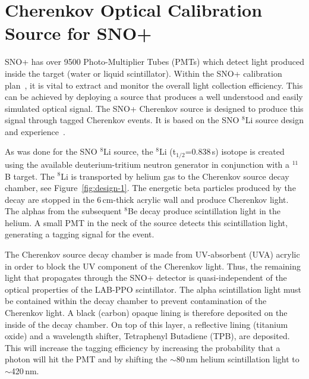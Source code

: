 \newcommand{\Li}{$^{8}$Li }
\renewcommand{\bf}{\bfseries}

\chapter{Cherenkov Optical Calibration Source for SNO+}
\label{ch:chsrc}

\label{chap:execsummary}

SNO+ has over 9500 Photo-Multiplier Tubes (PMTs) which detect light produced inside the target (water or liquid scintillator). Within the SNO+ calibration plan~\cite{gann:2013}, it is vital to extract and monitor the overall light collection efficiency. This can be achieved by deploying a source that produces a well understood and easily simulated optical signal. The SNO+ Cherenkov source is designed to produce this signal through tagged Cherenkov events. It is based on the SNO \Li source design and experience~\cite{Tagg:2002,Tagg:2001}.


As was done for the SNO \Li source, the \Li (t$_{1/2}$=0.838\,s) isotope is created using the available deuterium-tritium neutron generator in conjunction with a $^{11}$B target. The \Li is transported by helium gas to the Cherenkov source decay chamber, see Figure~\ref{fig:design-1}. The energetic beta particles produced by the decay are stopped in the 6\,cm-thick acrylic wall and produce Cherenkov light. The alphas from the subsequent $^{8}$Be decay produce scintillation light in the helium. A small PMT in the neck of the source detects this scintillation light, generating a tagging signal for the event. 

The Cherenkov source decay chamber is made from UV-absorbent (UVA) acrylic in order to block the UV component of the Cherenkov light. Thus, the remaining light that propagates through the SNO+ detector is quasi-independent of the optical properties of the LAB-PPO scintillator. The alpha scintillation light must be contained within the decay chamber to prevent contamination of the Cherenkov light. A black (carbon) opaque lining is therefore deposited on the inside of the decay chamber. On top of this layer, a reflective lining (titanium oxide) and a wavelength shifter, Tetraphenyl Butadiene (TPB), are deposited. This will increase the tagging efficiency by increasing the probability that a photon will hit the PMT and by shifting the  $\sim$80\,nm helium scintillation light to $\sim$420\,nm.

